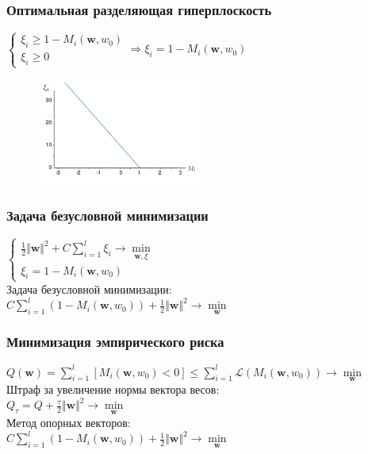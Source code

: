\documentclass[12pt]{beamer}
\begin{document}
\begin{frame}\frametitle{Оптимальная разделяющая гиперплоскость}
$\begin{cases}
\xi_i \geq 1 - M_i(\mathbf{w}, w_0) \\
\xi_i \geq 0
\end{cases} \Rightarrow \xi_i = 1 - M_i(\mathbf{w}, w_0) $\\
\begin{figure}[htbp]
  \includegraphics[height=100pt, keepaspectratio = true]{images/xi}   
\end{figure}
\end{frame}


\begin{frame}\frametitle{Задача безусловной минимизации}
$\begin{cases}
{\frac{1}{2}\Vert \mathbf{w} \Vert^2 + C \sum\limits_{i=1}^l \xi_i \rightarrow \min\limits_{\mathbf{w}, \xi}}\\
\xi_i = 1 - M_i(\mathbf{w}, w_0)
\end{cases}$\\
\vspace{5mm}
Задача безусловной минимизации:\\
$ C \sum\limits_{i=1}^l (1 - M_i(\mathbf{w}, w_0)) + \frac{1}{2}\Vert \mathbf{w} \Vert^2 \rightarrow \min\limits_{\mathbf{w}}$
\end{frame}

\begin{frame}\frametitle{Минимизация эмпирического риска}
${Q(\mathbf{w}) = \sum\limits_{i=1}^l \left[ M_i(\mathbf{w}, w_0) < 0 \right] \leq\sum\limits_{i=1}^l \mathcal{L}(M_i(\mathbf{w}, w_0)) \rightarrow \min\limits_{\mathbf{w}} }$\\\vspace{3mm}
Штраф за увеличение нормы вектора весов:\\
$Q_{\tau} = Q + \frac{\tau}{2}\Vert \mathbf{w} \Vert^2 \rightarrow \min\limits_{\mathbf{w}}$\\
\vspace{5mm}
Метод опорных векторов:\\
$ C\sum\limits_{i=1}^l (1 - M_i(\mathbf{w}, w_0)) + \frac{1}{2}\Vert \mathbf{w} \Vert^2 \rightarrow \min\limits_{\mathbf{w}}$

\end{frame}
\end{document}

